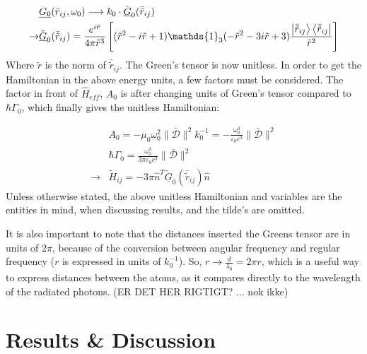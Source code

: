 \documentclass{article}
\begin{document}
\begin{equation}\label{eq:Green_unitless}
    \begin{split}
        &\underline{G_0}(\bar{r}_{ij}, \omega_0) \longrightarrow k_0 \cdot \tilde{\underline{G}}_0(\bar{\tilde{r}}_{ij}) \\
        \rightarrow &\tilde{\underline{G}}_0(\bar{\tilde{r}}_{ij}) = \frac{e^{i\tilde{r}}}{4\pi \tilde{r}^3} \left[ (\tilde{r}^2 - i\tilde{r} + 1) \mathds{1}_3 (-\tilde{r}^2 - 3i\tilde{r} + 3) \frac{\ket{\bar{\tilde{r}}_{ij}}\bra{\bar{\tilde{r}}_{ij}}}{\tilde{r}^2} \right]
    \end{split}
\end{equation}
Where $\tilde{r}$ is the norm of $\bar{\tilde{r}}_{ij}$. The Green's tensor is now unitless. In order to get the Hamiltonian in the above energy units, a few factors must be considered. The factor in front of $\hat{H}_{eff}$, $A_0$ is after changing units of Green's tensor compared to $\hbar \Gamma_0$, which finally gives the unitless Hamiltonian:

\begin{equation}\label{eq:Hamiltonian_unitless}
    \begin{split}
        &A_0 = -\mu_0 \omega_0^2 \| \bar{\mathscr{D}} \|^2 k_0^{-1} = - \frac{\omega_0^3}{\varepsilon_0 c^3} \| \bar{\mathscr{D}} \|^2 \\
        &\hbar \Gamma_0 = \frac{\omega_0^3}{3\pi \varepsilon_0 c^3} \| \bar{\mathscr{D}} \|^2 \\
        \longrightarrow & \tilde{H}_{ij} = -3 \pi \hat{n}^T \underline{\tilde{G}}_0 (\bar{\tilde{r}}_{ij}) \hat{n}
    \end{split}
\end{equation}
Unless otherwise stated, the above unitless Hamiltonian and variables are the entities in mind, when discussing results, and the tilde's are omitted. 

It is also important to note that the distances inserted the Greens tensor are in units of $2\pi$, because of the conversion between angular frequency and regular frequency ($r$ is expressed in units of $k_0^{-1}$). So, $r \rightarrow \frac{d}{\lambda_0} = 2 \pi r$, which is a useful way to express distances between the atoms, as it compares directly to the wavelength of the radiated photons. (ER DET HER RIGTIGT? ... nok ikke)

\section{Results \& Discussion}
\end{document}
